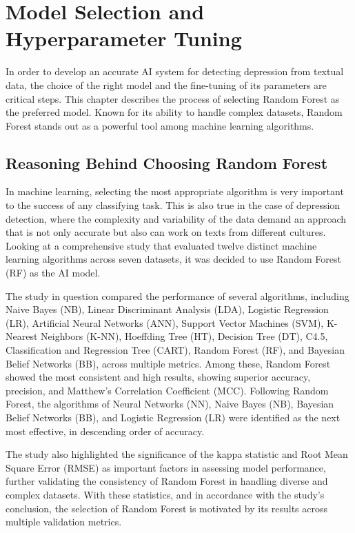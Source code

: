 \chapter{Model Selection and Hyperparameter Tuning}

\label{chap:ch3}

\quad In order to develop an accurate AI system for detecting depression from textual data, the choice of the right model and the fine-tuning of its parameters are critical steps. This chapter describes the process of selecting Random Forest as the preferred model. Known for its ability to handle complex datasets, Random Forest stands out as a powerful tool among machine learning algorithms.

\section{Reasoning Behind Choosing Random Forest}

In machine learning, selecting the most appropriate algorithm is very important to the success of any classifying task. This is also true in the case of depression detection, where the complexity and variability of the data demand an approach that is not only accurate but also can work on texts from different cultures. Looking at a  comprehensive study that evaluated twelve distinct machine learning algorithms across seven datasets\cite{siraj2023performanceModelComparison}, it was decided to use Random Forest (RF) as the AI model.

The study \cite{siraj2023performanceModelComparison} in question compared the performance of several algorithms, including Naive Bayes (NB), Linear Discriminant Analysis (LDA), Logistic Regression (LR), Artificial Neural Networks (ANN), Support Vector Machines (SVM), K-Nearest Neighbors (K-NN), Hoeffding Tree (HT), Decision Tree (DT), C4.5, Classification and Regression Tree (CART), Random Forest (RF), and Bayesian Belief Networks (BB), across multiple metrics. Among these, Random Forest showed the most consistent and high results, showing superior accuracy, precision, and Matthew’s Correlation Coefficient (MCC). Following Random Forest, the algorithms of Neural Networks (NN), Naive Bayes (NB), Bayesian Belief Networks (BB), and Logistic Regression (LR) were identified as the next most effective, in descending order of accuracy.

The study \cite{siraj2023performanceModelComparison} also highlighted the significance of the kappa statistic and Root Mean Square Error (RMSE) as important factors in assessing model performance, further validating the consistency of Random Forest in handling diverse and complex datasets. With these statistics, and in accordance with the study’s conclusion, the selection of Random Forest is motivated by its results across multiple validation metrics.


